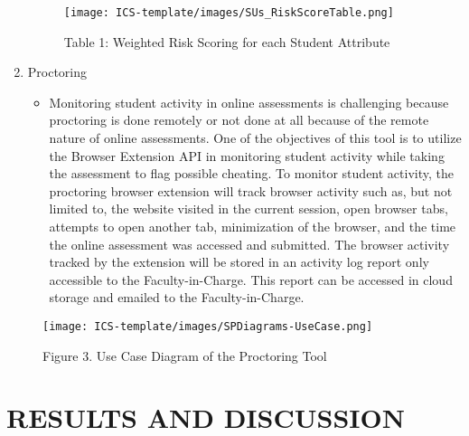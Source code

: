\documentclass{icsthesis}
\begin{document}
\begin{mainmatter}
\begin{enumerate}
                \begin{figure}[h]
                \centering
                \texttt{[image: ICS-template/images/SUs\_RiskScoreTable.png]}
                \newline
                \captionsetup{labelformat=empty}
                \caption{Table 1: Weighted Risk Scoring for each Student Attribute}
                \label{Weighted Risk Scoring for each Student Attribute}
                \end{figure}
        \vspace*{3cm}
        \item Proctoring
            \begin{itemize}
                \item Monitoring student activity in online assessments is challenging because proctoring is done remotely or not done at all because of the remote nature of online assessments. One of the objectives of this tool is to utilize the Browser Extension API in monitoring student activity while taking the assessment to flag possible cheating. To monitor student activity, the proctoring browser extension will track browser activity such as, but not limited to, the website visited in the current session, open browser tabs, attempts to open another tab, minimization of the browser, and the time the online assessment was accessed and submitted. The browser activity tracked by the extension will be stored in an activity log report only accessible to the Faculty-in-Charge. This report can be accessed in cloud storage and emailed to the Faculty-in-Charge.
            \end{itemize}
    \end{enumerate}
    
\begin{figure}[h]
    \centering
    \texttt{[image: ICS-template/images/SPDiagrams-UseCase.png]}
    \newline
    \captionsetup{labelformat=empty}
    \caption{Figure 3. Use Case Diagram of the Proctoring Tool}
    \label{Figure 3: Use Case Diagram of the Proctoring Tool}
\end{figure}
		
\section{RESULTS AND DISCUSSION}

\end{mainmatter}
\end{document}
